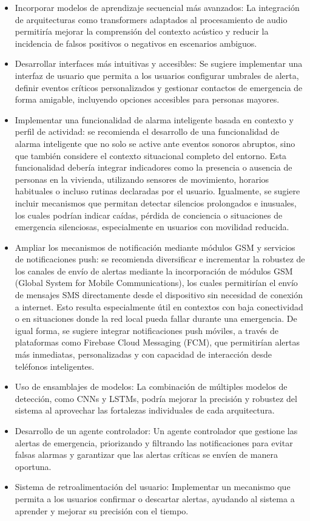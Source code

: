 
\begin{itemize}
  \item Incorporar modelos de aprendizaje secuencial más avanzados: La integración de arquitecturas como transformers adaptados al procesamiento de audio permitiría mejorar la comprensión del contexto acústico y reducir la incidencia de falsos positivos o negativos en escenarios ambiguos.
  \item Desarrollar interfaces más intuitivas y accesibles: Se sugiere implementar una interfaz de usuario que permita a los usuarios configurar umbrales de alerta, definir eventos críticos personalizados y gestionar contactos de emergencia de forma amigable, incluyendo opciones accesibles para personas mayores.
  \item Implementar una funcionalidad de alarma inteligente basada en contexto y perfil de actividad: se recomienda el desarrollo de una funcionalidad de alarma inteligente que no solo se active ante eventos sonoros abruptos, sino que también considere el contexto situacional completo del entorno. Esta funcionalidad debería integrar indicadores como la presencia o ausencia de personas en la vivienda, utilizando sensores de movimiento, horarios habituales o incluso rutinas declaradas por el usuario. Igualmente, se sugiere incluir mecanismos que permitan detectar silencios prolongados e inusuales, los cuales podrían indicar caídas, pérdida de conciencia o situaciones de emergencia silenciosas, especialmente en usuarios con movilidad reducida.
  \item Ampliar los mecanismos de notificación mediante módulos GSM y servicios de notificaciones push: se recomienda diversificar e incrementar la robustez de los canales de envío de alertas mediante la incorporación de módulos GSM (Global System for Mobile Communications), los cuales permitirían el envío de mensajes SMS directamente desde el dispositivo sin necesidad de conexión a internet. Esto resulta especialmente útil en contextos con baja conectividad o en situaciones donde la red local pueda fallar durante una emergencia. De igual forma, se sugiere integrar notificaciones push móviles, a través de plataformas como Firebase Cloud Messaging (FCM), que permitirían alertas más inmediatas, personalizadas y con capacidad de interacción desde teléfonos inteligentes.
  \item Uso de ensamblajes de modelos: La combinación de múltiples modelos de detección, como CNNs y LSTMs, podría mejorar la precisión y robustez del sistema al aprovechar las fortalezas individuales de cada arquitectura.
  \item Desarrollo de un agente controlador: Un agente controlador que gestione las alertas de emergencia, priorizando y filtrando las notificaciones para evitar falsas alarmas y garantizar que las alertas críticas se envíen de manera oportuna.
  \item Sistema de retroalimentación del usuario: Implementar un mecanismo que permita a los usuarios confirmar o descartar alertas, ayudando al sistema a aprender y mejorar su precisión con el tiempo.
\end{itemize}